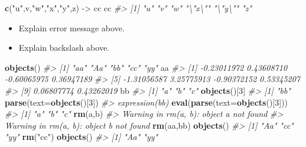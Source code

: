 \documentclass[
]{book}
\newenvironment{Shaded}{\begin{snugshade}}{\end{snugshade}}
\newcommand{\AttributeTok}[1]{\textcolor[rgb]{0.13,0.29,0.53}{#1}}
\newcommand{\CommentTok}[1]{\textcolor[rgb]{0.56,0.35,0.01}{\textit{#1}}}
\newcommand{\DecValTok}[1]{\textcolor[rgb]{0.00,0.00,0.81}{#1}}
\newcommand{\FunctionTok}[1]{\textcolor[rgb]{0.13,0.29,0.53}{\textbf{#1}}}
\newcommand{\NormalTok}[1]{#1}
\newcommand{\OtherTok}[1]{\textcolor[rgb]{0.56,0.35,0.01}{#1}}
\newcommand{\StringTok}[1]{\textcolor[rgb]{0.31,0.60,0.02}{#1}}
\providecommand{\tightlist}{%
  \setlength{\itemsep}{0pt}\setlength{\parskip}{0pt}}
\begin{document}
\begin{Shaded}
\begin{Highlighting}[]
\FunctionTok{c}\NormalTok{(}\StringTok{"u"}\NormalTok{,}\StringTok{\textquotesingle{}v\textquotesingle{}}\NormalTok{,}\StringTok{"\textquotesingle{}w\textquotesingle{}"}\NormalTok{,}\StringTok{\textquotesingle{}"x"\textquotesingle{}}\NormalTok{,}\StringTok{\textquotesingle{}"y"\textquotesingle{}}\NormalTok{,}\StringTok{\textquotesingle{}z\textquotesingle{}}\NormalTok{) }\OtherTok{{-}\textgreater{}}\NormalTok{ cc }
\NormalTok{cc}
\CommentTok{\#\textgreater{} [1] "u"     "v"     "\textquotesingle{}w\textquotesingle{}"   "\textbackslash{}"x\textbackslash{}"" "\textbackslash{}"y\textbackslash{}"" "z"}
\end{Highlighting}
\end{Shaded}

\begin{itemize}
\tightlist
\item
  Explain error message above.
\item
  Explain backslash above.
\end{itemize}

\begin{Shaded}
\begin{Highlighting}[]
\FunctionTok{objects}\NormalTok{()}
\CommentTok{\#\textgreater{} [1] "aa" "Aa" "bb" "cc" "yy"}
\NormalTok{aa}
\CommentTok{\#\textgreater{}  [1] {-}0.23011972  0.43608710 {-}0.60065975  0.36947189}
\CommentTok{\#\textgreater{}  [5] {-}1.31056587  3.25775913 {-}0.90372152  0.53345207}
\CommentTok{\#\textgreater{}  [9]  0.06807774  0.43262019}
\NormalTok{bb}
\CommentTok{\#\textgreater{} [1] "a" "b" "c"}
\FunctionTok{objects}\NormalTok{()[}\DecValTok{3}\NormalTok{]}
\CommentTok{\#\textgreater{} [1] "bb"}
\FunctionTok{parse}\NormalTok{(}\AttributeTok{text=}\FunctionTok{objects}\NormalTok{()[}\DecValTok{3}\NormalTok{])}
\CommentTok{\#\textgreater{} expression(bb)}
\FunctionTok{eval}\NormalTok{(}\FunctionTok{parse}\NormalTok{(}\AttributeTok{text=}\FunctionTok{objects}\NormalTok{()[}\DecValTok{3}\NormalTok{]))}
\CommentTok{\#\textgreater{} [1] "a" "b" "c"}
\FunctionTok{rm}\NormalTok{(a,b)}
\CommentTok{\#\textgreater{} Warning in rm(a, b): object \textquotesingle{}a\textquotesingle{} not found}
\CommentTok{\#\textgreater{} Warning in rm(a, b): object \textquotesingle{}b\textquotesingle{} not found}
\FunctionTok{rm}\NormalTok{(aa,bb)}
\FunctionTok{objects}\NormalTok{()}
\CommentTok{\#\textgreater{} [1] "Aa" "cc" "yy"}
\FunctionTok{rm}\NormalTok{(}\StringTok{"cc"}\NormalTok{)}
\FunctionTok{objects}\NormalTok{()}
\CommentTok{\#\textgreater{} [1] "Aa" "yy"}
\end{Highlighting}
\end{Shaded}
\end{document}
